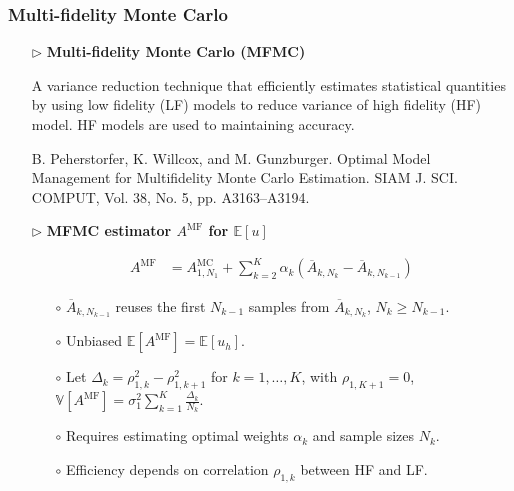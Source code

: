 \documentclass{beamer}
\begin{document}
\begin{frame}[t]
    \frametitle{Multi-fidelity Monte Carlo}
\begin{itemize}[leftmargin=5pt] 
\item[$\triangleright$] \textcolor{myblue3}{\bf Multi-fidelity Monte Carlo (MFMC)} 

{\footnotesize A variance reduction technique that efficiently estimates statistical quantities by using low fidelity (LF) models to reduce variance of high fidelity (HF) model. HF models are used to maintaining accuracy.}

%
\vspace{2mm}
%
{\fontsize{7}{7}\selectfont \textcolor{mygray2}{B. Peherstorfer, K. Willcox, and M. Gunzburger. Optimal Model Management for Multifidelity Monte Carlo Estimation. SIAM J. SCI. COMPUT, Vol. 38, No. 5, pp. A3163–A3194.}\par}
%

\item[$\triangleright$]\textcolor{myblue3}{\bf MFMC estimator $A^{\text{MF}}$ for $\mathbb{E}[u]$} 

{\footnotesize 
\vspace{-3mm}
\begin{align*}
A^{\text{MF}} &= A^{\text{MC}}_{1,N_1} + \sum_{k=2}^K \alpha_k\left(\overline{A}_{k,N_k} - \overline{A}_{k,N_{k-1}} \right)
\end{align*}
\vspace{-3mm}

\begin{itemize}[leftmargin=15pt] 
    \item[$\circ$] $\overline{A}_{k,N_{k-1}}$ reuses the first $N_{k-1}$ samples from $\overline{A}_{k,N_{k}}$, $N_k\ge N_{k-1}$.
    \item[$\circ$] Unbiased $\mathbb{E}[A^{\text{MF}}] = \mathbb{E}[u_h]$.
    \item[$\circ$] Let $\Delta_k = \rho_{1,k}^2 - \rho_{1,k+1}^2$ for $k = 1, \dots, K$, with $\rho_{1,K+1} = 0$, $\mathbb{V}[A^{\text{MF}}]= \sigma_1^2\sum_{k=1}^K\frac{\Delta_{k}}{N_k}$.
    \item[$\circ$] Requires estimating optimal weights $\alpha_k$ and sample sizes $N_k$.
    \item[$\circ$] Efficiency depends on correlation $\rho_{1,k}$ between HF and LF.
\end{itemize}
}
\end{itemize}
\end{frame}
\end{document}
